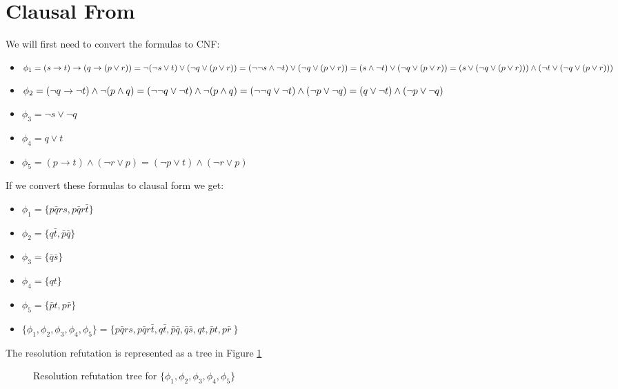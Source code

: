 \documentclass[]{article}
\begin{document}
\section{Clausal From}
We will first need to convert the formulas to CNF:
\begin{itemize}[noitemsep]
\item $\phi_1 = (s\rightarrow t) \rightarrow (q \rightarrow (p \lor r))  = \lnot(\lnot s \lor t) \lor (\lnot q \lor (p \lor r)) 
\\ = (\lnot\lnot s \wedge \lnot t) \lor (\lnot q \lor (p \lor r)) = (s \wedge \lnot t) \lor (\lnot q \lor (p \lor r))
\\ = (s \lor (\lnot q \lor (p \lor r))) \wedge (\lnot t \lor (\lnot q \lor (p \lor r)))$
\item $\phi_2 = (\lnot q \rightarrow \lnot t) \wedge \lnot(p \wedge q) =  (\lnot\lnot q \lor \lnot t) \wedge \lnot(p \wedge q) = (\lnot\lnot q \lor \lnot t) \wedge (\lnot p \lor \lnot q) 
\\ = (q \lor \lnot t) \wedge (\lnot p \lor \lnot q)$
\item $\phi_3 = \lnot s \lor \lnot q$
\item $\phi_4 = q \lor t$
\item $\phi_5 = (p \rightarrow t) \wedge (\lnot r \lor p) = (\lnot p \lor t) \wedge (\lnot r \lor p)$
\end{itemize}
If we convert these formulas to clausal form we get:
\begin{itemize}[noitemsep]
\item $\phi_1 = \{p\bar{q}rs, p\bar{q}r\bar{t}\}$
\item $\phi_2 = \{q\bar{t}, \bar{p}\bar{q}\}$
\item $\phi_3 = \{\bar{q}\bar{s}\}$
\item $\phi_4 = \{qt\}$
\item $\phi_5 = \{\bar{p}t, p\bar{r}\}$
\item $\{\phi_1,\phi_2,\phi_3,\phi_4,\phi_5\} = \{p\bar{q}rs, p\bar{q}r\bar{t}, q\bar{t}, \bar{p}\bar{q}, \bar{q}\bar{s}, qt, \bar{p}t, p\bar{r}\ \}$
\end{itemize}

\noindent The resolution refutation is represented as a tree in Figure \ref{fig:refutation}\\
\begin{figure}[h]
\centering
{}
\caption{Resolution refutation tree for $\{\phi_1,\phi_2,\phi_3,\phi_4,\phi_5\}$} \label{fig:refutation}
\end{figure}
\end{document}
